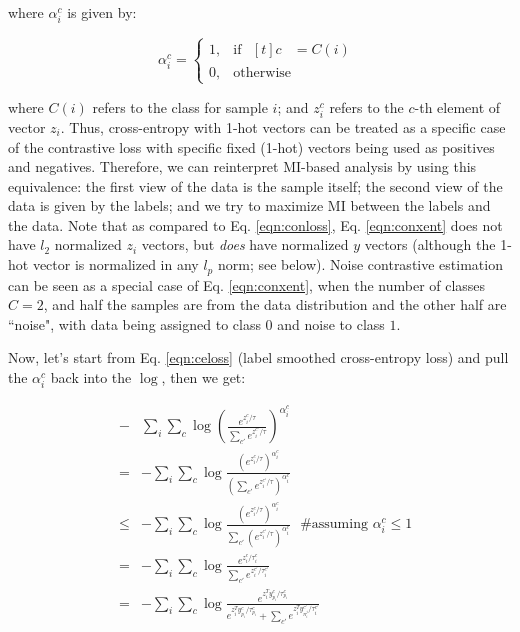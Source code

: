 \documentclass[10pt,letterpaper]{article}
\begin{document}
where $\alpha_i^c$ is given by:

\begin{equation}
\alpha_i^c =
\begin{cases}
  1, & \text{if }
       \!\begin{aligned}[t]
       c &= C(i)
       \end{aligned}
\\
  0, & \text{otherwise}
\end{cases}
\label{eqn:alpha}
\end{equation}

where $C(i)$ refers to the class for sample $i$; and $z_i^c$ refers to the $c$-th element of vector $z_i$. Thus, cross-entropy with 1-hot vectors can be treated as a specific case of the contrastive loss with specific fixed (1-hot) vectors being used as positives and negatives. Therefore, we can reinterpret MI-based analysis by using this equivalence: the first view of the data is the sample itself; the second view of the data is given by the labels; and we try to maximize MI between the labels and the data. Note that as compared to Eq. \ref{eqn:conloss}, Eq. \ref{eqn:conxent} does not have $l_2$ normalized $z_i$ vectors, but \emph{does} have normalized $y$ vectors (although the 1-hot vector is normalized in any $l_p$ norm; see below). Noise contrastive estimation can be seen as a special case of Eq. \ref{eqn:conxent}, when the number of classes $C=2$, and half the samples are from the data distribution and the other half are ``noise", with data being assigned to class $0$ and noise to class $1$.

Now, let's start from Eq. \ref{eqn:celoss} (label smoothed cross-entropy loss) and  pull the $\alpha_i^c$ back into the $\log$, then we get:

\begin{eqnarray}
&-& \sum_i  \sum_c \log \left(\frac{e^{z_i^c/\tau}}{\sum_{c'} e^{z_i^{c'}/\tau}}\right)^{\alpha_i^c}  \nonumber \\
&=& - \sum_i  \sum_c \log \frac{(e^{z_i^c/\tau})^{\alpha_i^c}}{(\sum_{c'} e^{z_i^{c'}/\tau})^{\alpha_i^c}} \nonumber \\
&\leq& - \sum_i  \sum_c \log \frac{(e^{z_i^c/\tau})^{\alpha_i^c}}{\sum_{c'} (e^{z_i^{c'}/\tau})^{\alpha_i^c}} ~~~\text{\# assuming $\alpha_i^c \leq 1$} \nonumber \\
&=& - \sum_i  \sum_c \log \frac{e^{z_i^c/{\tau_i^c}}}{\sum_{c'} e^{z_i^{c'}/{\tau_i^{c'}}}} \nonumber \\
&=& - \sum_i  \sum_c \log \frac{e^{z_i^Ty^c_{p_i}/\tau^c_{p_i}}}{e^{z_i^Ty^c_{p_i}/\tau^c_{p_i}} + \sum_{c'} e^{z_i^Ty^{c'}_{n^j_i}/{\tau_i^{c'}}}}
\label{eqn:celsloss}
\end{eqnarray}
\end{document}
